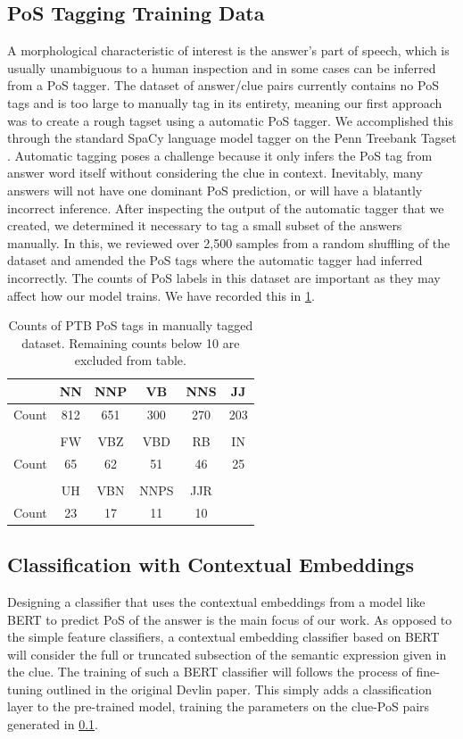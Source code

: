 \documentclass[11pt]{article}
\begin{document}
\subsection{PoS Tagging Training Data}
\label{sec:training_data}
A morphological characteristic of interest is the answer's part of speech, which is usually unambiguous to a human inspection and in some cases can be inferred from a PoS tagger. The dataset of answer/clue pairs currently contains no PoS tags and is too large to manually tag in its entirety, meaning our first approach was to create a rough tagset using a automatic PoS tagger. We accomplished this through the standard SpaCy language model tagger on the Penn Treebank Tagset \cite{Marcus93-penntreebank}. Automatic tagging poses a challenge because it only infers the PoS tag from answer word itself without considering the clue in context. Inevitably, many answers will not have one dominant PoS prediction, or will have a blatantly incorrect inference. After inspecting the output of the automatic tagger that we created, we determined it necessary to tag a small subset of the answers manually. In this, we reviewed over 2,500 samples from a random shuffling of the dataset and amended the PoS tags where the automatic tagger had inferred incorrectly. The counts of PoS labels in this dataset are important as they may affect how our model trains. We have recorded this in \ref{tab:pos_frequencies}.
\begin{table}[ht]
    \centering
    \begin{tabular}{c|ccccc}
         & NN & NNP & VB & NNS & JJ \\
         \hline
        Count & 812 & 651 & 300 & 270 & 203\\
        \\
        & FW & VBZ & VBD & RB & IN \\
        \hline
        Count & 65 & 62 & 51 & 46 & 25\\
        \\
        & UH & VBN & NNPS & JJR &\\
        \hline
        Count & 23 & 17 & 11 & 10 &
    \end{tabular}
    \caption{Counts of PTB PoS tags in manually tagged dataset. Remaining counts below 10 are excluded from table.}
    \label{tab:pos_frequencies}
\end{table}

\subsection{Classification with Contextual Embeddings}
Designing a classifier that uses the contextual embeddings from a model like BERT \cite{Devlin18-BERT} to predict PoS of the answer is the main focus of our work. As opposed to the simple feature classifiers, a contextual embedding classifier based on BERT will consider the full or truncated subsection of the semantic expression given in the clue. The training of such a BERT classifier will follows the process of fine-tuning outlined in the original Devlin paper. This simply adds a classification layer to the pre-trained model, training the parameters on the clue-PoS pairs generated in \ref{sec:training_data}.
\end{document}
